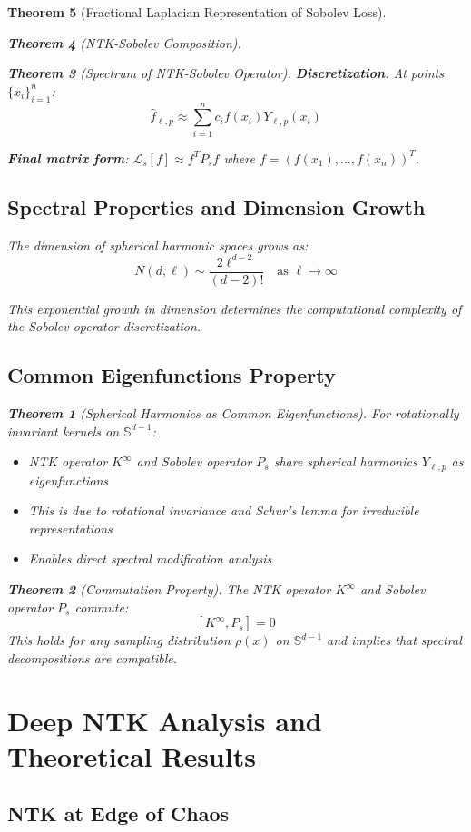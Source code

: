 \documentclass{article}
\newtheorem{theorem}{Theorem}[section]
\begin{document}
\begin{theorem}[Fractional Laplacian Representation of Sobolev Loss]
\begin{theorem}[NTK-Sobolev Composition]
\begin{theorem}[Spectrum of NTK-Sobolev Operator]
\textbf{Discretization}: At points $\{x_i\}_{i=1}^n$:
\[ \hat{f}_{\ell,p} \approx \sum_{i=1}^n c_i f(x_i) Y_{\ell,p}(x_i) \]

\textbf{Final matrix form}: $\mathcal{L}_s[f] \approx f^T P_s f$ where $f = (f(x_1), \ldots, f(x_n))^T$.

\subsection{Spectral Properties and Dimension Growth}

The dimension of spherical harmonic spaces grows as:
\[ N(d,\ell) \sim \frac{2\ell^{d-2}}{(d-2)!} \quad \text{as } \ell \to \infty \]

This exponential growth in dimension determines the computational complexity of the Sobolev operator discretization.

\subsection{Common Eigenfunctions Property}

\begin{theorem}[Spherical Harmonics as Common Eigenfunctions]
For rotationally invariant kernels on $\mathbb{S}^{d-1}$:
\begin{itemize}
\item NTK operator $K^{\infty}$ and Sobolev operator $P_s$ share spherical harmonics $Y_{\ell,p}$ as eigenfunctions
\item This is due to rotational invariance and Schur's lemma for irreducible representations
\item Enables direct spectral modification analysis
\end{itemize}
\end{theorem}

\begin{theorem}[Commutation Property]
The NTK operator $K^{\infty}$ and Sobolev operator $P_s$ commute:
\[ [K^{\infty}, P_s] = 0 \]
This holds for any sampling distribution $\rho(x)$ on $\mathbb{S}^{d-1}$ and implies that spectral decompositions are compatible.
\end{theorem}

\newpage

\section{Deep NTK Analysis and Theoretical Results}

\subsection{NTK at Edge of Chaos}


\end{theorem}
\end{theorem}
\end{theorem}
\end{document}
